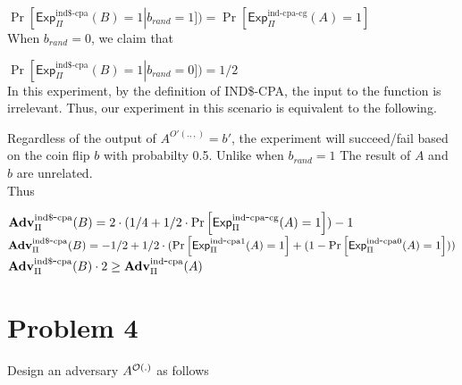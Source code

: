 \documentclass[11pt]{article}
\newcommand{\ExpINDz}[2]{\mathsf{Exp}^{\mathrm{ind}\mbox{-}\mathrm{cpa0}}_{#1}{(#2)}}
\newcommand{\ExpINDo}[2]{\mathsf{Exp}^{\mathrm{ind}\mbox{-}\mathrm{cpa1}}_{#1}{(#2)}}
\newcommand{\ExpINDR}[2]{\mathsf{Exp}^{\mathrm{ind\$}\mbox{-}\mathrm{cpa}}_{#1}{(#2)}}
\newcommand{\ExpINDCG}[2]{\mathsf{Exp}^{\mathrm{ind}\mbox{-}\mathrm{cpa}\mbox{-}\mathrm{cg}}_{#1}{(#2)}}
\newcommand{\AdvINDR}[2]{\Adv^{\mathrm{ind\$}\mbox{-}\mathrm{cpa}}_{#1}(#2)}
\newcommand{\AdvIND}[2]{\Adv^{\mathrm{ind}\mbox{-}\mathrm{cpa}}_{#1}(#2)}
\begin{document}
$\Pr\left[\ExpINDR{\Pi}{B}=1 \right| b_{rand} = 1]) = \Pr\left[\ExpINDCG{\Pi}{A}=1\right]$\\

When $b_{rand}=0$, we claim that 

$\Pr\left[\ExpINDR{\Pi}{B}=1 \right| b_{rand} = 0]) = 1/2$\\

In this experiment, by the definition of IND\$-CPA, the input to the function is irrelevant.  Thus, our experiment in this scenario is equivalent to the following.

\begin{figure*}[h]
\center
{}
\end{figure*}

Regardless of the output of $A^{O'(.,,)}=b'$, the experiment will succeed/fail based on the coin flip $b$ with probabilty 0.5. Unlike when $b_{rand} = 1$ The result of $A$ and $b$ are unrelated.  \\

Thus

$\AdvINDR{\Pi}{B} = 2 \cdot ( 1/4  + 1/2 \cdot \Pr\left[\ExpINDCG{\Pi}{A}=1\right] ) - 1$\\
$\AdvINDR{\Pi}{B} = -1/2 + 1/2 \cdot (\Pr\left[\ExpINDo{\Pi}{A}=1\right] + (1 - \Pr\left[\ExpINDz{\Pi}{A}=1\right])) $\\
$\AdvINDR{\Pi}{B} \cdot 2 \geq \AdvIND{\Pi}{A}$







\section*{Problem 4} 

Design an adversary $A^{{\cal O}(.)}$ as follows

\begin{figure*}[h]
\center
{}
\end{figure*}
\end{document}
